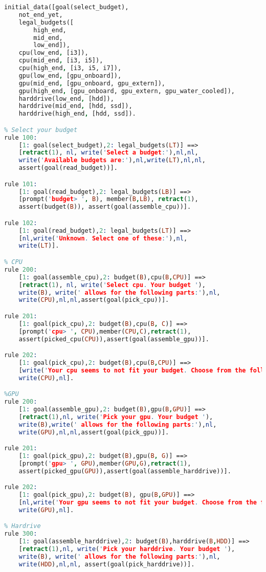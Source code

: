 \documentclass[12pt]{article}
\begin{document}
\begin{lstlisting}[language=Prolog]
initial_data([goal(select_budget),
	not_end_yet,
	legal_budgets([
		high_end,
		mid_end,
		low_end]),
	cpu(low_end, [i3]),
	cpu(mid_end, [i3, i5]),
	cpu(high_end, [i3, i5, i7]),
	gpu(low_end, [gpu_onboard]),
	gpu(mid_end, [gpu_onboard, gpu_extern]),
	gpu(high_end, [gpu_onboard, gpu_extern, gpu_water_cooled]),
	harddrive(low_end, [hdd]),
	harddrive(mid_end, [hdd, ssd]),
	harddrive(high_end, [hdd, ssd]).

% Select your budget
rule 100:
	[1: goal(select_budget),2: legal_budgets(LT)] ==>
	[retract(1), nl, write('Select a budget:'),nl,nl,
	write('Available budgets are:'),nl,write(LT),nl,nl,
	assert(goal(read_budget))].

rule 101:
	[1: goal(read_budget),2: legal_budgets(LB)] ==>
	[prompt('budget> ', B),	member(B,LB), retract(1),
	assert(budget(B)), assert(goal(assemble_cpu))].

rule 102:
	[1: goal(read_budget),2: legal_budgets(LT)] ==>
	[nl,write('Unknown. Select one of these:'),nl,
	write(LT)].

% CPU
rule 200:
	[1: goal(assemble_cpu),2: budget(B),cpu(B,CPU)] ==>
	[retract(1), nl, write('Select cpu. Your budget '),
	write(B), write(' allows for the following parts:'),nl,
	write(CPU),nl,nl,assert(goal(pick_cpu))].

rule 201:
	[1: goal(pick_cpu),2: budget(B),cpu(B, C)] ==>
	[prompt('cpu> ', CPU),member(CPU,C),retract(1),
	assert(picked_cpu(CPU)),assert(goal(assemble_gpu))].

rule 202:
	[1: goal(pick_cpu),2: budget(B),cpu(B,CPU)]	==>
	[write('Your cpu seems to not fit your budget. Choose from the following:'),nl,
	write(CPU),nl].

%GPU
rule 200:
	[1: goal(assemble_gpu),2: budget(B),gpu(B,GPU)] ==>
	[retract(1),nl,	write('Pick your gpu. Your budget '),
	write(B),write(' allows for the following parts:'),nl,
	write(GPU),nl,nl,assert(goal(pick_gpu))].

rule 201:
	[1: goal(pick_gpu),2: budget(B),gpu(B, G)] ==>
	[prompt('gpu> ', GPU),member(GPU,G),retract(1),
	assert(picked_gpu(GPU)),assert(goal(assemble_harddrive))].

rule 202:
	[1: goal(pick_gpu),2: budget(B), gpu(B,GPU)] ==>
	[nl,write('Your gpu seems to not fit your budget. Choose from the following:'),nl,
	write(GPU),nl].

% Hardrive
rule 300:
	[1: goal(assemble_harddrive),2: budget(B),harddrive(B,HDD)] ==>
	[retract(1),nl, write('Pick your harddrive. Your budget '),
	write(B), write(' allows for the following parts:'),nl,
	write(HDD),nl,nl, assert(goal(pick_harddrive))].


\end{lstlisting}
\end{document}
